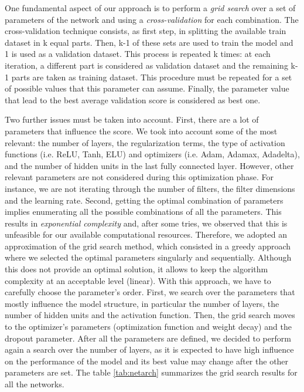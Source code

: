 \documentclass[10pt,conference,compsocconf]{IEEEtran}
\begin{document}
One fundamental aspect of our approach is to perform a \textit{grid search} over a set of parameters of the network and using a \textit{cross-validation} for each combination. The cross-validation technique consists, as first step, in splitting the available train dataset in k equal parts. Then, k-1 of these sets are used to train the model and 1 is used as a validation dataset. This process is repeated k times: at each iteration, a different part is considered as validation dataset and the remaining k-1 parts are taken as training dataset. This procedure must be repeated for a set of possible values that this parameter can assume. Finally, the parameter value that lead to the best average validation score is considered as best one.

Two further issues must be taken into account. First, there are a lot of parameters that influence the score. We took into account some of the most relevant: the number of layers, the regularization terms, the type of activation functions (i.e. ReLU, Tanh, ELU) and optimizers (i.e. Adam, Adamax, Adadelta), and the number of hidden units in the last fully connected layer. However, other relevant parameters are not considered during this optimization phase. For instance, we are not iterating through the number of filters, the filter dimensions and the learning rate. Second, getting the optimal combination of parameters implies enumerating all the possible combinations of all the parameters. This results in \textit{exponential complexity} and, after some tries, we observed that this is unfeasible for our available computational resources. Therefore, we adopted an approximation of the grid search method, which consisted in a greedy approach where we selected the optimal parameters singularly and sequentially. Although this does not provide an optimal solution, it allows to keep the algorithm complexity at an acceptable level (linear). With this approach, we have to carefully choose the parameter's order. First, we search over the parameters that mostly influence the model structure, in particular the number of layers, the number of hidden units and the activation function. Then, the grid search moves to the optimizer's parameters (optimization function and weight decay) and the dropout parameter. After all the parameters are defined, we decided to perform again a search over the number of layers, as it is expected to have high influence on the performance of the model and its best value may change after the other parameters are set.
The table \ref{tab:netarch} summarizes the grid search results for all the networks.
\end{document}
